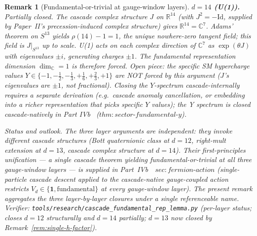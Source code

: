 \documentclass[12pt,a4paper]{article}
\newtheorem{remark}[theorem]{Remark}
\begin{document}
\begin{remark}[Fundamental-or-trivial at gauge-window layers]
\medskip\noindent\textbf{$d=14$ (U(1)).}
Partially closed. The cascade complex structure $J$ on
$\mathbb{R}^{14}$ (with $J^2=-\mathrm{Id}$, supplied by Paper~II's
precession-induced complex structure) gives $\mathbb{R}^{14}=
\mathbb{C}^7$. Adams' theorem on $S^{13}$ yields $\rho(14)-1=1$, the
unique nowhere-zero tangent field; this field is $J|_{S^{13}}$ up to
scale. U(1) acts on each complex direction of $\mathbb{C}^7$ as
$\exp(\theta J)$ with eigenvalues $\pm i$, generating charges $\pm 1$.
The fundamental representation dimension $\dim_{\mathbb{C}}=1$ is
therefore forced. \emph{Open piece:} the specific SM hypercharge
values $Y\in\{-1,-\tfrac{1}{2},-\tfrac{1}{3},+\tfrac{1}{6},
+\tfrac{2}{3},+1\}$ are NOT forced by this argument
($J$'s eigenvalues are $\pm 1$, not fractional). Closing the
$Y$-spectrum cascade-internally requires a separate derivation
(e.g.\ cascade anomaly cancellation, or embedding into a richer
representation that picks specific $Y$ values); the Y spectrum is
closed cascade-natively in Part IVb~\cite{part4b}
($\mathit{thm{:}sector\text{-}fundamental\text{-}y}$).

\medskip\noindent\emph{Status and outlook.}
The three layer arguments are independent: they invoke different
cascade structures (Bott quaternionic class at $d=12$, right-mult
extension at $d=13$, cascade complex structure at $d=14$). Their
first-principles unification --- a single cascade theorem yielding
fundamental-or-trivial at all three gauge-window layers --- is
supplied in Part~IVb~\cite{part4b}~$\mathit{sec{:}fermion\text{-}action}$
(single-particle cascade descent applied to the cascade-native
gauge-coupled action restricts $V_d \in \{\mathbf{1},
\text{fundamental}\}$ at every gauge-window layer). The present
remark aggregates the three layer-by-layer closures under a single
referenceable name. Verifier:
\texttt{tools/research/cascade\_fundamental\_rep\_lemma.py}
(per-layer status; closes $d=12$ structurally and $d=14$ partially;
$d=13$ now closed by Remark~\ref{rem:single-h-factor}).
\end{remark}
\end{document}
